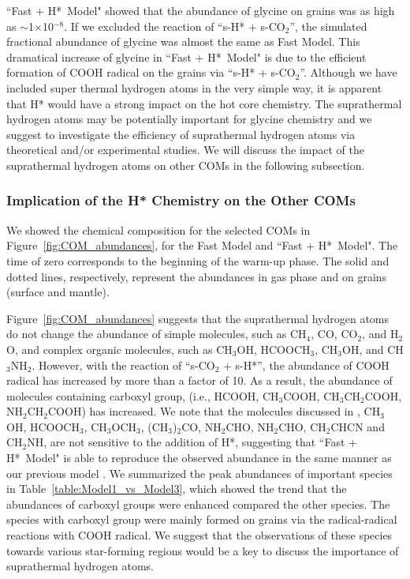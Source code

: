 \documentclass{aastex61}
\begin{document}
%
``Fast + H*~Model" showed that the abundance of glycine on grains was as high as $\sim$1$\times$10$^{-8}$.
%
If we excluded the reaction of ``s-H* + s-CO$_2$'', the simulated fractional abundance of glycine was almost the same as Fast Model.
%
This dramatical increase of glycine in ``Fast + H*~Model" is due to the efficient formation of COOH radical on the grains via ``s-H* + s-CO$_2$''.
%
Although we have included super thermal hydrogen atoms in the very simple way, it is apparent that H* would have a strong impact on the hot core chemistry.
%
The suprathermal hydrogen atoms may be potentially important for glycine chemistry and we suggest to investigate the efficiency of suprathermal hydrogen atoms via theoretical and/or experimental studies.
%
We will discuss the impact of the suprathermal hydrogen atoms on other COMs in the following subsection.



\subsubsection{Implication of the H* Chemistry on the Other COMs}
We showed the chemical composition for the selected COMs in Figure~\ref{fig:COM_abundances}, for the Fast Model and ``Fast + H*~Model".
%
The time of zero corresponds to the beginning of the warm-up phase.
%
The solid and dotted lines, respectively, represent the abundances in gas phase and on grains (surface and mantle).
%


Figure~\ref{fig:COM_abundances} suggests that the suprathermal hydrogen atoms do not change the abundance of simple molecules, such as CH$_4$, CO, CO$_2$, and H$_2$O, and complex organic molecules, such as CH$_3$OH, HCOOCH$_3$, CH$_3$OH, and CH$_3$NH$_2$.
%
However, with the reaction of ``s-CO$_2$ + s-H*'', the abundance of COOH radical has increased by more than a factor of 10.
%
As a result, the abundance of molecules containing carboxyl group, (i.e., HCOOH, CH$_3$COOH, CH$_3$CH$_2$COOH, NH$_2$CH$_2$COOH) has increased.
%
We note that the molecules discussed in \cite{Suzuki17}, CH$_3$OH, HCOOCH$_3$, CH$_3$OCH$_3$, (CH$_3$)$_2$CO, NH$_2$CHO, NH$_2$CHO, CH$_2$CHCN and CH$_2$NH, are not sensitive to the addition of H*, suggesting that ``Fast + H*~Model" is able to reproduce the observed abundance in the same manner as our previous model \citep{Suzuki17}.
%
We summarized the peak abundances of important species in Table~\ref{table:Model1_vs_Model3}, which showed the trend that the abundances of carboxyl groups were enhanced compared the other species.
%
The species with carboxyl group were mainly formed on grains via the radical-radical reactions with COOH radical.
%
We suggest that the observations of these species towards various star-forming regions would be a key to discuss the importance of suprathermal hydrogen atoms.
\end{document}
